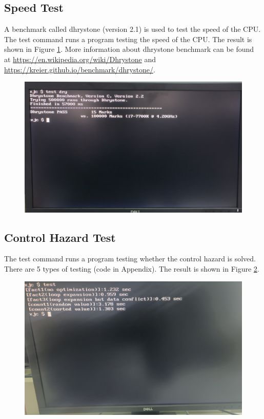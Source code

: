 \documentclass[
	a4paper, %
	11pt, %
]{CSUniSchoolLabReport}
\begin{document}
\subsection{Speed Test}
A benchmark called dhrystone (version 2.1) is used to test the speed of the CPU. The test command runs a program testing the speed of the CPU. The result is shown in Figure \ref{fig:image14}. More information about dhrystone benchmark can be found at \url{https://en.wikipedia.org/wiki/Dhrystone} and \url{https://kreier.github.io/benchmark/dhrystone/}.
\begin{figure}[!htb]
    \centering
    \includegraphics[width=12cm]{image14.png}
    \label{fig:image14}
\end{figure}

\subsection{Control Hazard Test}
The test command runs a program testing whether the control hazard is solved. There are 5 types of testing (code in Appendix). The result is shown in Figure \ref{fig:image9}.
\begin{figure}[!htb]
    \centering
    \includegraphics[width=12cm]{image9.png}
    \label{fig:image9}
\end{figure}
\end{document}
